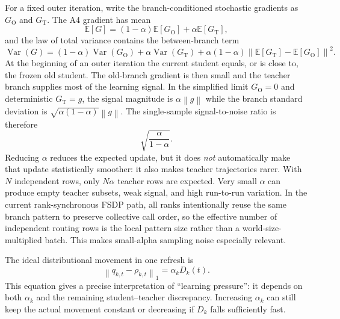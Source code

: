 \documentclass[11pt,a4paper]{article}
\newcommand{\E}{\mathbb{E}}
\newcommand{\norm}[1]{\left\lVert #1 \right\rVert}
\theoremstyle{plain}
\theoremstyle{definition}
\begin{document}
For a fixed outer iteration, write the branch-conditioned stochastic gradients as $G_{\mathrm O}$
and $G_{\mathrm T}$.  The A4 gradient has mean
\begin{equation}
\E[G]
=(1-\alpha)\E[G_{\mathrm O}]
+\alpha\E[G_{\mathrm T}],
\label{eq:alpha-gradient-mean}
\end{equation}
and the law of total variance contains the between-branch term
\begin{equation}
\operatorname{Var}(G)
=
(1-\alpha)\operatorname{Var}(G_{\mathrm O})
+\alpha\operatorname{Var}(G_{\mathrm T})
+\alpha(1-\alpha)
\norm{\E[G_{\mathrm T}]-\E[G_{\mathrm O}]}^2.
\label{eq:alpha-gradient-variance}
\end{equation}
At the beginning of an outer iteration the current student equals, or is close to, the frozen old
student.  The old-branch gradient is then small and the teacher branch supplies most of the
learning signal.  In the simplified limit $G_{\mathrm O}=0$ and deterministic $G_{\mathrm T}=g$,
the signal magnitude is $\alpha\norm{g}$ while the branch standard deviation is
$\sqrt{\alpha(1-\alpha)}\norm{g}$.  The single-sample signal-to-noise ratio is therefore
\begin{equation}
\sqrt{\frac{\alpha}{1-\alpha}}.
\label{eq:bernoulli-gradient-snr}
\end{equation}
Reducing $\alpha$ reduces the expected update, but it does \emph{not} automatically make that
update statistically smoother: it also makes teacher trajectories rarer.  With $N$ independent
rows, only $N\alpha$ teacher rows are expected.  Very small $\alpha$ can produce empty teacher
subsets, weak signal, and high run-to-run variation.  In the current rank-synchronous FSDP path,
all ranks intentionally reuse the same branch pattern to preserve collective call order, so the
effective number of independent routing rows is the local pattern size rather than a
world-size-multiplied batch.  This makes small-alpha sampling noise especially relevant.

The ideal distributional movement in one refresh is
\begin{equation}
\norm{q_{k,t}-\rho_{k,t}}_1
=\alpha_k D_k(t).
\label{eq:ideal-trust-step}
\end{equation}
This equation gives a precise interpretation of ``learning pressure'': it depends on both
$\alpha_k$ and the remaining student--teacher discrepancy.  Increasing $\alpha_k$ can still keep
the actual movement constant or decreasing if $D_k$ falls sufficiently fast.
\end{document}

